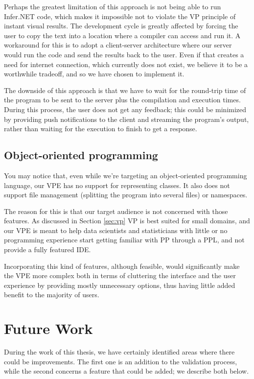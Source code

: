 Perhaps the greatest limitation of this approach is not being able to run Infer.NET
code, which makes it impossible not to violate the VP principle of instant visual results.
The development cycle is greatly affected by forcing the user to copy the text
into a location where a compiler can access and run it. A workaround for this
is to adopt a client-server architecture where our server would run the code
and send the results back to the user. Even if that creates a need for internet
connection, which currently does not exist, we believe it to be a worthwhile tradeoff,
and so we have chosen to implement it.

The downside of this approach is that we have to wait for the round-trip time
of the program to be sent to the server plus the compilation and execution times.
During this process, the user does not get any feedback; this could be minimized
by providing push notifications to the client and streaming the program's output,
rather than waiting for the execution to finish to get a response.

\subsection{Object-oriented programming}

You may notice that, even while we're targeting an object-oriented programming
language, our VPE has no support for representing classes. It also does not
support file management (splitting the program into several files) or namespaces.

The reason for this is that our target audience is not concerned with those features.
As discussed in Section \ref{sec:vp} VP is best suited for small domains, and our
VPE is meant to help data scientists and statisticians with little or no programming
experience start getting familiar with PP through a PPL, and not provide a
fully featured IDE.

Incorporating this kind of features, although feasible, would significantly
make the VPE more complex both in terms of cluttering the interface and the user
experience by providing mostly unnecessary options, thus having little added
benefit to the majority of users.

\section{Future Work}

During the work of this thesis, we have certainly identified areas where there
could be improvements. The first one is an addition to the validation process, while the
second concerns a feature that could be added; we describe both below.

